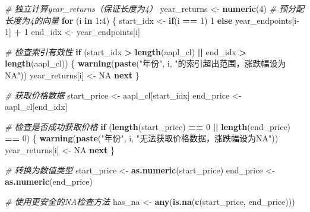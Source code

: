 \documentclass[]{ctexbook}
\newenvironment{Shaded}{\begin{snugshade}}{\end{snugshade}}
\newcommand{\CommentTok}[1]{\textcolor[rgb]{0.56,0.35,0.01}{\textit{#1}}}
\newcommand{\ConstantTok}[1]{\textcolor[rgb]{0.56,0.35,0.01}{#1}}
\newcommand{\ControlFlowTok}[1]{\textcolor[rgb]{0.13,0.29,0.53}{\textbf{#1}}}
\newcommand{\DecValTok}[1]{\textcolor[rgb]{0.00,0.00,0.81}{#1}}
\newcommand{\FunctionTok}[1]{\textcolor[rgb]{0.13,0.29,0.53}{\textbf{#1}}}
\newcommand{\NormalTok}[1]{#1}
\newcommand{\OtherTok}[1]{\textcolor[rgb]{0.56,0.35,0.01}{#1}}
\newcommand{\SpecialCharTok}[1]{\textcolor[rgb]{0.81,0.36,0.00}{\textbf{#1}}}
\newcommand{\StringTok}[1]{\textcolor[rgb]{0.31,0.60,0.02}{#1}}
\begin{document}
\begin{Shaded}
\begin{Highlighting}[]
\CommentTok{\# 独立计算year\_returns（保证长度为4）}
\NormalTok{year\_returns }\OtherTok{\textless{}{-}} \FunctionTok{numeric}\NormalTok{(}\DecValTok{4}\NormalTok{)  }\CommentTok{\# 预分配长度为4的向量}
\ControlFlowTok{for}\NormalTok{ (i }\ControlFlowTok{in} \DecValTok{1}\SpecialCharTok{:}\DecValTok{4}\NormalTok{) \{}
\NormalTok{  start\_idx }\OtherTok{\textless{}{-}} \ControlFlowTok{if}\NormalTok{(i }\SpecialCharTok{==} \DecValTok{1}\NormalTok{) }\DecValTok{1} \ControlFlowTok{else}\NormalTok{ year\_endpoints[i}\DecValTok{{-}1}\NormalTok{] }\SpecialCharTok{+} \DecValTok{1}
\NormalTok{  end\_idx }\OtherTok{\textless{}{-}}\NormalTok{ year\_endpoints[i]}
  
  \CommentTok{\# 检查索引有效性}
  \ControlFlowTok{if}\NormalTok{ (start\_idx }\SpecialCharTok{\textgreater{}} \FunctionTok{length}\NormalTok{(aapl\_cl) }\SpecialCharTok{||}\NormalTok{ end\_idx }\SpecialCharTok{\textgreater{}} \FunctionTok{length}\NormalTok{(aapl\_cl)) \{}
    \FunctionTok{warning}\NormalTok{(}\FunctionTok{paste}\NormalTok{(}\StringTok{"年份"}\NormalTok{, i, }\StringTok{"的索引超出范围，涨跌幅设为NA"}\NormalTok{))}
\NormalTok{    year\_returns[i] }\OtherTok{\textless{}{-}} \ConstantTok{NA}
    \ControlFlowTok{next}
\NormalTok{  \}}
  
  \CommentTok{\# 获取价格数据}
\NormalTok{  start\_price }\OtherTok{\textless{}{-}}\NormalTok{ aapl\_cl[start\_idx]}
\NormalTok{  end\_price }\OtherTok{\textless{}{-}}\NormalTok{ aapl\_cl[end\_idx]}
  
  \CommentTok{\# 检查是否成功获取价格}
  \ControlFlowTok{if}\NormalTok{ (}\FunctionTok{length}\NormalTok{(start\_price) }\SpecialCharTok{==} \DecValTok{0} \SpecialCharTok{||} \FunctionTok{length}\NormalTok{(end\_price) }\SpecialCharTok{==} \DecValTok{0}\NormalTok{) \{}
    \FunctionTok{warning}\NormalTok{(}\FunctionTok{paste}\NormalTok{(}\StringTok{"年份"}\NormalTok{, i, }\StringTok{"无法获取价格数据，涨跌幅设为NA"}\NormalTok{))}
\NormalTok{    year\_returns[i] }\OtherTok{\textless{}{-}} \ConstantTok{NA}
    \ControlFlowTok{next}
\NormalTok{  \}}
  
  \CommentTok{\# 转换为数值类型}
\NormalTok{  start\_price }\OtherTok{\textless{}{-}} \FunctionTok{as.numeric}\NormalTok{(start\_price)}
\NormalTok{  end\_price }\OtherTok{\textless{}{-}} \FunctionTok{as.numeric}\NormalTok{(end\_price)}
  
  \CommentTok{\# 使用更安全的NA检查方法}
\NormalTok{  has\_na }\OtherTok{\textless{}{-}} \FunctionTok{any}\NormalTok{(}\FunctionTok{is.na}\NormalTok{(}\FunctionTok{c}\NormalTok{(start\_price, end\_price)))}
  

\end{Highlighting}
\end{Shaded}
\end{document}
